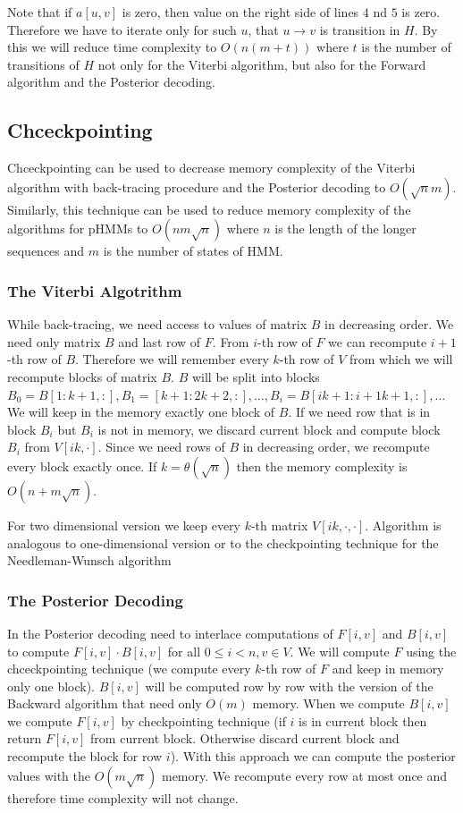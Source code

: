 Note that if $a[u,v]$ is zero, then value on the right side of lines $4$ nd $5$
is zero. Therefore we have to iterate only for such $u$, that $u\to v$ is
transition in $H$. By this we will reduce time complexity to $O(n(m+t))$ where
$t$ is the number of transitions of $H$ not only for the Viterbi algorithm, but
also for the Forward algorithm and the Posterior decoding.


\subsection{Chceckpointing}
\label{SECTION:HMMCHECKPOINTING}
Chceckpointing can be used to decrease memory complexity of the Viterbi
algorithm with back-tracing procedure and the Posterior decoding to $O(\sqrt n
m)$.  Similarly, this technique can be used to reduce memory complexity of the
algorithms for pHMMs to $O(nm\sqrt n )$ where $n$ is the length of the longer
sequences and $m$ is the number of states of HMM.

\subsubsection{The Viterbi Algotrithm}
While back-tracing, we need access to values of matrix $B$ in decreasing order.
We need only matrix $B$ and last row of $F$. From $i$-th row of $F$ we can
recompute $i+1$-th row of $B$. Therefore we will remember every $k$-th row
of $V$ from which we will recompute blocks of matrix $B$. $B$ will be split into
blocks
$B_0=B[1:k+1,:],B_1=[k+1:2k+2,:],\dots,B_i=B[ik+1:{i+1}k+1,:],\dots$
We will keep in the memory exactly one block of $B$. If we need row that is in block
$B_i$ but $B_i$ is not in memory, we discard current block and compute block
$B_i$ from $V[ik,\cdot]$. Since we need rows of $B$ in decreasing order, we
recompute every block exactly once. If $k=\theta(\sqrt n)$ then the memory
complexity is  $O(n+m\sqrt n)$.

For two dimensional version we keep every $k$-th matrix $V[ik,\cdot,\cdot]$.
Algorithm is analogous to one-dimensional version or to the checkpointing
technique for the Needleman-Wunsch algorithm

\subsubsection{The Posterior Decoding}

In the Posterior decoding need to interlace computations of $F[i,v]$ and
$B[i,v]$ to compute $F[i,v]\cdot B[i,v]$ for all $0\leq i<n,v\in V$. We will
compute $F$ using the chceckpointing technique (we compute every $k$-th row of
$F$ and keep in memory only one block).  $B[i,v]$ will be computed row by row
with the version of the  Backward algorithm that need only $O(m)$ memory. When
we compute $B[i,v]$ we compute $F[i,v]$ by checkpointing technique (if $i$ is in
current block then return $F[i,v]$ from current block. Otherwise discard current
block and recompute the block for row $i$). With this approach we can
compute the posterior values with the $O(m\sqrt n)$ memory. We recompute every row at most
once and therefore time complexity will not change.


